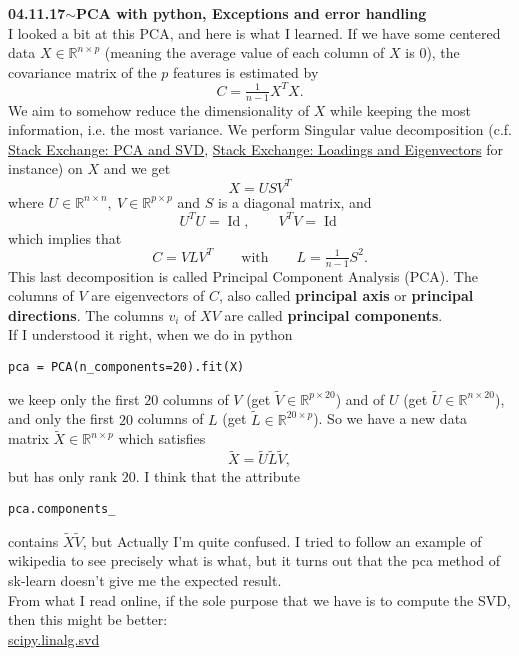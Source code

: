 \documentclass[11pt,a4paper]{article}
\newenvironment{loggentry}[2]%
{\noindent\textbf{#1}\hspace{1cm}$\mathbf{\sim}$\text{ }\textbf{#2}\\}{\vspace{0.5cm}}
\newcommand{\R}{\mathbb{R}}
\begin{document}
\begin{loggentry}{04.11.17}{PCA with python, Exceptions and error handling}
I looked a bit at this PCA, and here is what I learned. If we have some centered data $X\in \R^{n\times p}$ (meaning the average value of each column of $X$ is $0$), the covariance matrix of the $p$ features is estimated by
$$
C=\tfrac{1}{n-1}X^TX.
$$
We aim to somehow reduce the dimensionality of $X$ while keeping the most information, i.e. the most variance. We perform Singular value decomposition (c.f. \href{https://stats.stackexchange.com/questions/134282/relationship-between-svd-and-pca-how-to-use-svd-to-perform-pca#134283}{Stack Exchange: PCA and SVD}, \href{https://stats.stackexchange.com/questions/125684/how-does-fundamental-theorem-of-factor-analysis-apply-to-pca-or-how-are-pca-l}{Stack Exchange: Loadings and Eigenvectors} for instance) on $X$ and we get
$$
X=USV^T
$$
where 
$
U\in \R^{n \times n},\ V\in\R^{p\times p}
$ 
and $S$ is a diagonal matrix, and 
$$
U^TU = \operatorname{Id}, \qquad V^TV = \operatorname{Id}
$$
which implies that 
$$
C=VLV^T \qquad \text{with} \qquad L = \tfrac{1}{n-1}S^2.
$$
This last decomposition is called Principal Component Analysis (PCA). The columns of $V$ are eigenvectors of $C$, also called \textbf{principal axis} or \textbf{principal directions}. The columns $v_i$ of $XV$ are called \textbf{principal components}.\\
If I understood it right, when we do in python
\begin{verbatim}
pca = PCA(n_components=20).fit(X)
\end{verbatim}
we keep only the first $20$ columns of $V$ (get $\tilde{V}\in \R^{p\times 20}$) and of $U$ (get $\tilde{U}\in \R^{n\times 20}$), and only the first $20$ columns of $L$ (get $\tilde{L}\in \R^{20 \times p}$). So we have a new data matrix 
$
\tilde{X} \in \R^{n\times p}
$ 
which satisfies 
$$
\tilde{X} = \tilde{U}\tilde{L}\tilde{V},
$$
but has only rank $20$. I think that the attribute 
\begin{verbatim}
pca.components_
\end{verbatim}
contains $\tilde{X}\tilde{V}$, but Actually I'm quite confused. I tried to follow an example of wikipedia to see precisely what is what, but it turns out that the pca method of sk-learn doesn't give me the expected result.\\
From what I read online, if the sole purpose that we have is to compute the SVD, then this might be better:\\
\href{https://docs.scipy.org/doc/scipy/reference/generated/scipy.linalg.svd.html}{scipy.linalg.svd}


\end{loggentry}
\end{document}
